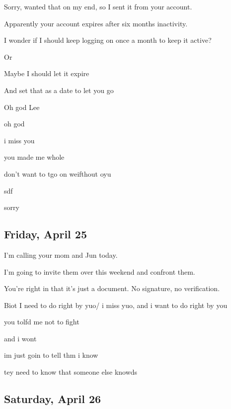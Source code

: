 { Sorry, wanted that on my end, so I sent it from your account.

 Apparently your account expires after six months inactivity.

 I wonder if I should keep logging on once a month to keep it active?

 Or

 Maybe I should let it expire

 And set that as a date to let you go

 Oh god Lee

 oh god

 i miss you

 you made me whole

 don't want to tgo on weifthout oyu

 sdf

 sorry

\newpage

\subsection*{Friday, April 25}\label{friday-april-25}

 I'm calling your mom and Jun today.

 I'm going to invite them over this weekend and confront them.

 You're right in that it's just a document. No signature, no verification.

 Biot I need to do right by yuo/ i miss yuo, and i want to do right by you

 you tolfd me not to fight

 and i wont

 im just goin to tell thm i know

 tey need to know that someone else knowds

\newpage

\subsection*{Saturday, April 26}\label{saturday-april-26}

}
